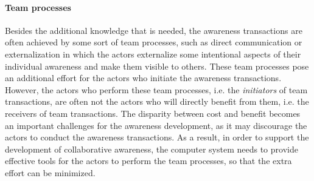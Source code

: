 \paragraph*{Team processes} %
\label{par:team_processes}
Besides the additional knowledge that is needed, the awareness transactions are often achieved by some sort of team processes, such as direct communication or externalization in which the actors externalize some intentional aspects of their individual awareness and make them visible to others. These team processes pose an additional effort for the actors who initiate the awareness transactions. However, the actors who perform these team processes, i.e. the \emph{initiators} of team transactions, are often not the actors who will directly benefit from them, i.e. the receivers of team transactions. The disparity between cost and benefit \cite{Grudin1994} becomes an important challenges for the awareness development, as it may discourage the actors to conduct the awareness transactions.  As a result, in order to support the development of collaborative awareness, the computer system needs to provide effective tools for the actors to perform the team processes, so that the extra effort can be minimized.


